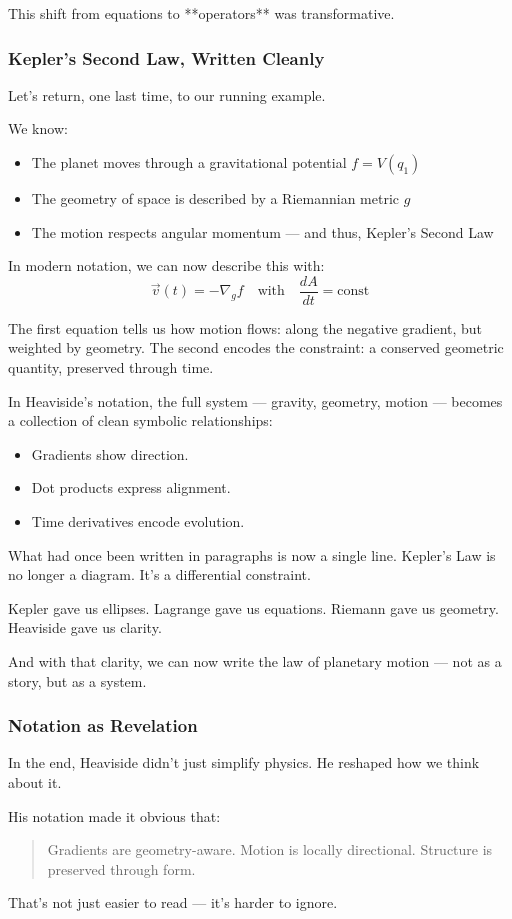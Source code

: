 This shift from equations to **operators** was transformative.

\subsubsection*{Kepler’s Second Law, Written Cleanly}

Let’s return, one last time, to our running example.

We know:
\begin{itemize}
  \item The planet moves through a gravitational potential \( f = V(q_1) \)
  \item The geometry of space is described by a Riemannian metric \( g \)
  \item The motion respects angular momentum — and thus, Kepler’s Second Law
\end{itemize}

In modern notation, we can now describe this with:
\[
\vec{v}(t) = -\nabla_g f
\quad \text{with} \quad
\frac{dA}{dt} = \text{const}
\]

The first equation tells us how motion flows: along the negative gradient, but weighted by geometry.  
The second encodes the constraint: a conserved geometric quantity, preserved through time.

In Heaviside’s notation, the full system — gravity, geometry, motion — becomes a collection of clean symbolic relationships:
\begin{itemize}
    \item Gradients show direction.
    \item Dot products express alignment.
    \item Time derivatives encode evolution.
\end{itemize}

What had once been written in paragraphs is now a single line.  
Kepler’s Law is no longer a diagram. It’s a differential constraint.

\begin{tcolorbox}[colback=blue!5!white, colframe=blue!50!black, title={Heaviside’s Gift to Kepler}]
Kepler gave us ellipses.  
Lagrange gave us equations.  
Riemann gave us geometry.  
Heaviside gave us clarity.

And with that clarity, we can now write the law of planetary motion —  
not as a story, but as a system.
\end{tcolorbox}

\subsubsection*{Notation as Revelation}

In the end, Heaviside didn’t just simplify physics.  
He reshaped how we think about it.

His notation made it obvious that:
\begin{quote}
    Gradients are geometry-aware.  
    Motion is locally directional.  
    Structure is preserved through form.
\end{quote}

That’s not just easier to read — it’s harder to ignore.
